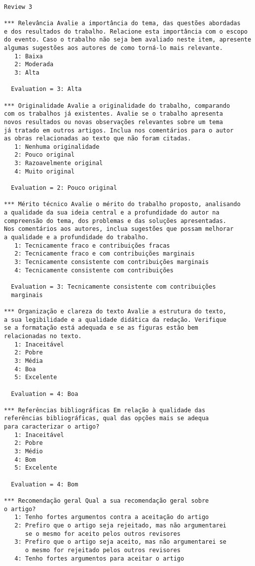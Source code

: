 \begin{verbatim}

Review 3

*** Relevância Avalie a importância do tema, das questões abordadas 
e dos resultados do trabalho. Relacione esta importância com o escopo 
do evento. Caso o trabalho não seja bem avaliado neste item, apresente 
algumas sugestões aos autores de como torná-lo mais relevante.
   1: Baixa
   2: Moderada
   3: Alta

  Evaluation = 3: Alta

*** Originalidade Avalie a originalidade do trabalho, comparando 
com os trabalhos já existentes. Avalie se o trabalho apresenta 
novos resultados ou novas observações relevantes sobre um tema 
já tratado em outros artigos. Inclua nos comentários para o autor 
as obras relacionadas ao texto que não foram citadas.
   1: Nenhuma originalidade
   2: Pouco original
   3: Razoavelmente original
   4: Muito original

  Evaluation = 2: Pouco original

*** Mérito técnico Avalie o mérito do trabalho proposto, analisando 
a qualidade da sua ideia central e a profundidade do autor na 
compreensão do tema, dos problemas e das soluções apresentadas. 
Nos comentários aos autores, inclua sugestões que possam melhorar 
a qualidade e a profundidade do trabalho.
   1: Tecnicamente fraco e contribuições fracas
   2: Tecnicamente fraco e com contribuições marginais
   3: Tecnicamente consistente com contribuições marginais
   4: Tecnicamente consistente com contribuições

  Evaluation = 3: Tecnicamente consistente com contribuições 
  marginais

*** Organização e clareza do texto Avalie a estrutura do texto, 
a sua legibilidade e a qualidade didática da redação. Verifique 
se a formatação está adequada e se as figuras estão bem 
relacionadas no texto.
   1: Inaceitável
   2: Pobre
   3: Média
   4: Boa
   5: Excelente

  Evaluation = 4: Boa

*** Referências bibliográficas Em relação à qualidade das 
referências bibliográficas, qual das opções mais se adequa 
para caracterizar o artigo?
   1: Inaceitável
   2: Pobre
   3: Médio
   4: Bom
   5: Excelente

  Evaluation = 4: Bom

*** Recomendação geral Qual a sua recomendação geral sobre 
o artigo?
   1: Tenho fortes argumentos contra a aceitação do artigo
   2: Prefiro que o artigo seja rejeitado, mas não argumentarei 
      se o mesmo for aceito pelos outros revisores
   3: Prefiro que o artigo seja aceito, mas não argumentarei se 
      o mesmo for rejeitado pelos outros revisores
   4: Tenho fortes argumentos para aceitar o artigo


\end{verbatim}
